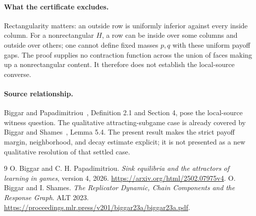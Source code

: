 \documentclass[11pt]{article}
\theoremstyle{definition}
\theoremstyle{remark}
\begin{document}
\paragraph{What the certificate excludes.}
Rectangularity matters: an outside row is uniformly inferior against every inside column. For a nonrectangular $H$, a row can be inside over some columns and outside over others; one cannot define fixed masses $p,q$ with these uniform payoff gaps. The proof supplies no contraction function across the union of faces making up a nonrectangular content. It therefore does not establish the local-source converse.

\paragraph{Source relationship.}
Biggar and Papadimitriou~\cite{source}, Definition 2.1 and Section 4, pose the local-source witness question. The qualitative attracting-subgame case is already covered by Biggar and Shames~\cite{chain}, Lemma 5.4. The present result makes the strict payoff margin, neighborhood, and decay estimate explicit; it is not presented as a new qualitative resolution of that settled case.

\begin{thebibliography}{9}
 O. Biggar and C. H. Papadimitriou.
\emph{Sink equilibria and the attractors of learning in games}, version 4, 2026.
\url{https://arxiv.org/html/2502.07975v4}.
 O. Biggar and I. Shames.
\emph{The Replicator Dynamic, Chain Components and the Response Graph}. ALT 2023.
\url{https://proceedings.mlr.press/v201/biggar23a/biggar23a.pdf}.
\end{thebibliography}
\end{document}
